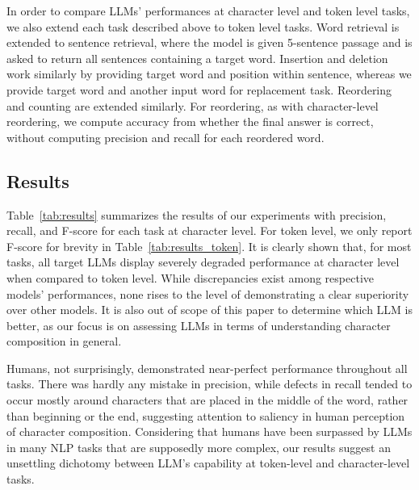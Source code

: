 \documentclass{article}
\theoremstyle{plain}
\theoremstyle{definition}
\theoremstyle{remark}
\begin{document}
In order to compare LLMs' performances at character level and token level tasks, we also extend each task described above to token level tasks. Word retrieval is extended to sentence retrieval, where the model is given 5-sentence passage and is asked to return all sentences containing a target word. Insertion and deletion work similarly by providing target word and position within sentence, whereas we provide target word and another input word for replacement task. Reordering and counting are extended similarly. For reordering, as with character-level reordering, we compute accuracy from whether the final answer is correct, without computing precision and recall for each reordered word. 


\subsection{Results}\label{sec:results}

Table~\ref{tab:results} summarizes the results of our experiments with precision, recall, and F-score for each task at character level. For token level, we only report F-score for brevity in Table~\ref{tab:results_token}. It is clearly shown that, for most tasks, all target LLMs display severely degraded performance at character level when compared to token level. While discrepancies exist among respective models' performances, none rises to the level of demonstrating a clear superiority over other models. It is also out of scope of this paper to determine which LLM is better, as our focus is on assessing LLMs in terms of understanding character composition in general. 

Humans, not surprisingly, demonstrated near-perfect performance throughout all tasks. There was hardly any mistake in precision, while defects in recall tended to occur mostly around characters that are placed in the middle of the word, rather than beginning or the end, suggesting attention to saliency in human perception of character composition. Considering that humans have been surpassed by LLMs in many NLP tasks that are supposedly more complex, our results suggest an unsettling dichotomy between LLM's capability at token-level and character-level tasks.
\end{document}
